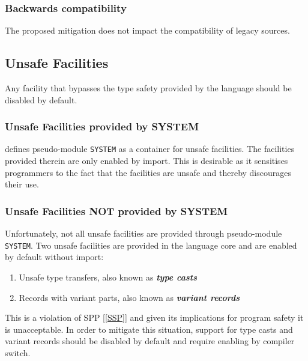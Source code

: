 \documentclass[10pt,a4paper]{article}
\renewcommand{\emph}[1]{\textbf{\textit{#1}}}
\begin{document}
\subsubsection{Backwards compatibility}

The proposed mitigation does not impact the compatibility of legacy sources.


\subsection{Unsafe Facilities}

Any facility that bypasses the type safety provided by the language should be
disabled by default.

\subsubsection{Unsafe Facilities provided by SYSTEM}
\cite{Wirth88} defines pseudo-module \verb|SYSTEM| as a container for unsafe
facilities. The facilities provided therein are only enabled by import. This
is desirable as it sensitises programmers to the fact that the facilities are
unsafe and thereby discourages their use.
 
\subsubsection{Unsafe Facilities NOT provided by SYSTEM}
Unfortunately, not all unsafe facilities are provided through pseudo-module
\verb|SYSTEM|. Two unsafe facilities are provided in the language core and are
enabled by default without import:

\begin{enumerate}[itemindent=-0.75em]
\item Unsafe type transfers, also known as \emph{type casts}
\item Records with variant parts, also known as \emph{variant records}
\end{enumerate}

\par\noindent This is a violation of SPP [\ref{SSP}] and given its implications
for program safety it is unacceptable. In order to mitigate this situation,
support for type casts and variant records should be disabled by default and
require enabling by compiler switch.
\end{document}
